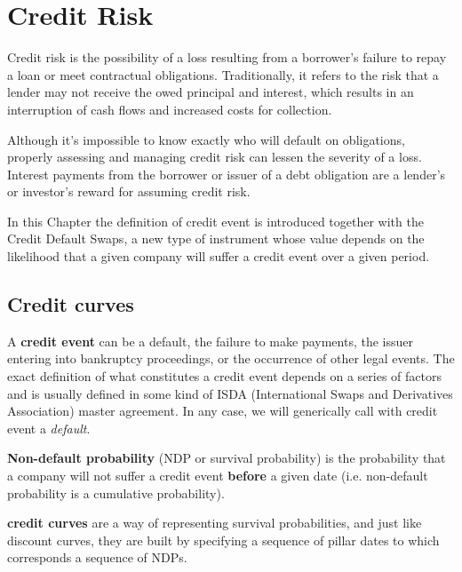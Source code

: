 \chapter{Credit Risk}\label{credit_default_swaps}

Credit risk is the possibility of a loss resulting from a borrower's failure to repay a loan or meet contractual obligations. Traditionally, it refers to the risk that a lender may not receive the owed principal and interest, which results in an interruption of cash flows and increased costs for collection. 

Although it's impossible to know exactly who will default on obligations, properly assessing and managing credit risk can lessen the severity of a loss. Interest payments from the borrower or issuer of a debt obligation are a lender's or investor's reward for assuming credit risk.

In this Chapter the definition of credit event is introduced together with the Credit Default Swaps, a new type of instrument whose value depends on the likelihood that a given company will suffer a credit event over a given period.

\section{Credit curves}
\label{credit-curves}

A \textbf{credit event} can be a default, the failure to make payments, the issuer entering into bankruptcy proceedings, or the occurrence of other legal events. The exact definition of what constitutes a credit event depends on a series of factors and is usually defined in some kind of ISDA (International Swaps and Derivatives Association) master agreement. In any case, we will generically call with credit event a \emph{default}.

\textbf{Non-default probability} (NDP or survival probability) is the probability that a company will not suffer a credit event \textbf{before} a given date (i.e. non-default probability is a cumulative probability).

\textbf{credit curves} are a way of representing survival probabilities, and just like discount curves, they are built by specifying a sequence of pillar dates to which corresponds a sequence of NDPs. 


